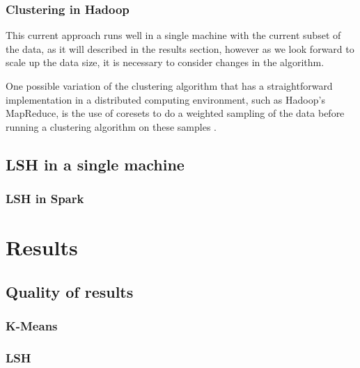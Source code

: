 \documentclass[10pt,a4paper]{scrartcl}
\begin{document}
      \subsubsection{Clustering in Hadoop}
        This current approach runs well in a single machine with the current
        subset of the data, as it will described in the results section,
        however as we look forward to scale up the data size, it is necessary
        to consider changes in the algorithm.
        
        One possible variation of the clustering algorithm that has a
        straightforward implementation in a distributed computing environment,
        such as Hadoop's MapReduce, is the use of coresets to do a weighted
        sampling of the data before running a clustering algorithm on these
        samples \cite{feldman2011scalable}.
    \subsection{LSH in a single machine}
      \subsubsection{LSH in Spark}
  \section{Results}
    \subsection{Quality of results}
      \subsubsection{K-Means}
      \subsubsection{LSH}
  
  
\end{document}
